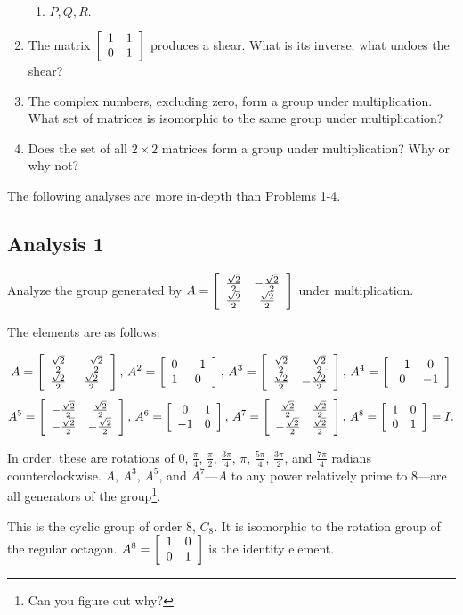 \documentclass[../gatm.tex]{subfiles}
\begin{document}
\begin{enumerate}
\begin{multicols}{4}
\begin{enumerate}
\item ${P,Q,R}.$
\end{enumerate}
\end{multicols}
\item The matrix $\left[\begin{array}{cc} 1 & 1 \\ 0 & 1 \end{array}\right]$ produces a shear. What is its inverse; what undoes the shear?
\item The complex numbers, excluding zero, form a group under multiplication. What set of matrices is isomorphic to the same group under multiplication?
\item Does the set of all $2\times 2$ matrices form a group under multiplication? Why or why not?
\end{enumerate}

The following analyses are more in-depth than Problems 1-4.

\subsection{Analysis 1}

Analyze the group generated by $A=\left[\begin{array}{cc} \frac{\sqrt{2}}{2} & -\frac{\sqrt{2}}{2} \\ \frac{\sqrt{2}}{2} & \frac{\sqrt{2}}{2} \end{array}\right]$ under multiplication.

The elements are as follows:

$$A= \left[\begin{array}{cc} \frac{\sqrt{2}}{2} & -\frac{\sqrt{2}}{2} \\ \frac{\sqrt{2}}{2} & \frac{\sqrt{2}}{2} \end{array}\right],\, 
A^2 = \left[\begin{array}{cc} 0 & -1 \\ 1 & 0 \end{array}\right],\, 
A^3 = \left[\begin{array}{cc} \frac{\sqrt{2}}{2} & -\frac{\sqrt{2}}{2} \\ \frac{\sqrt{2}}{2} & -\frac{\sqrt{2}}{2} \end{array}\right],\, 
A^4 = \left[\begin{array}{cc} -1 & 0 \\ 0 & -1 \end{array}\right]$$
$$A^5 = \left[\begin{array}{cc} -\frac{\sqrt{2}}{2} & \frac{\sqrt{2}}{2} \\ -\frac{\sqrt{2}}{2} & -\frac{\sqrt{2}}{2} \end{array}\right],\, 
A^6 = \left[\begin{array}{cc} 0 & 1 \\ -1 & 0 \end{array}\right],\, 
A^7 = \left[\begin{array}{cc} \frac{\sqrt{2}}{2} & \frac{\sqrt{2}}{2} \\ -\frac{\sqrt{2}}{2} & \frac{\sqrt{2}}{2} \end{array}\right],\, 
A^8 = \left[\begin{array}{cc} 1 & 0 \\ 0 & 1 \end{array}\right] = I.$$

In order, these are rotations of $0$, $\frac{\pi}{4}$, $\frac{\pi}{2}$, $\frac{3\pi}{4}$, $\pi$, $\frac{5\pi}{4}$, $\frac{3\pi}{2}$, and $\frac{7\pi}{4}$ radians counterclockwise. $A$, $A^3$, $A^5$, and $A^7$---$A$ to any power relatively prime to $8$---are all generators of the group\footnote{Can you figure out why?}.

This is the cyclic group of order $8$, $C_8$. It is isomorphic to the rotation group of the regular octagon. $A^8=\left[\begin{array}{cc} 1 & 0 \\ 0 & 1 \end{array}\right]$ is the identity element. 
\end{document}
